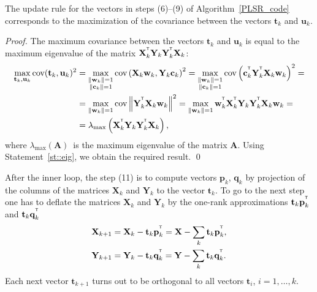 \documentclass[runningheads]{llncs}
\newcommand{\bw}{\mathbf{w}}
\newcommand{\bY}{\mathbf{Y}}
\newcommand{\bX}{\mathbf{X}}
\newcommand{\bu}{\mathbf{u}}
\newcommand{\bt}{\mathbf{t}}
\newcommand{\bp}{\mathbf{p}}
\newcommand{\bq}{\mathbf{q}}
\newcommand{\bc}{\mathbf{c}}
\newcommand{\T}{^{\text{\tiny\sffamily\upshape\mdseries T}}}
\begin{document}
\begin{proposition}

The update rule for the vectors in steps (6)--(9) of Algorithm~\ref{PLSR_code} corresponds to the maximization of the covariance between the vectors $\bt_k$ and $\bu_k$.
\end{proposition}
\begin{proof}
The maximum covariance between the vectors $\bt_k$ and $\bu_k$ is equal to the maximum eigenvalue of the matrix $\bX_k^{\T} \bY_k \bY_k^{\T} \bX_k$:
\begin{align*}
\max_{\bt_k, \bu_k}  \text{cov} (\bt_k, \bu_k)^2 &= \max_{\substack{\|\bw_k\|=1 \\ \|\bc_k\| = 1}} \text{cov} \left( \bX_k \bw_k, \bY_k \bc_k \right)^2 = \max_{\substack{\|\bw_k\|=1 \\ \|\bc_k\| = 1}} \text{cov} \left(\bc_k^{\T}  \bY_k^{\T} \bX_k \bw_k \right)^2 = \\
&= \max_{\|\bw_k\| = 1} \text{cov} \left\|\bY_k^{\T} \bX_k \bw_k \right\|^2 = \max_{\|\bw_k\| = 1} \bw_k^{\T} \bX_k^{\T} \bY_k \bY_k^{\T} \bX_k \bw_k = \\
& = \lambda_{\max} \left( \bX_k^{\T} \bY_k \bY_k^{\T} \bX_k \right),
\end{align*}
where $ \lambda_{\max} (\mathbf{A})$~is the maximum eigenvalue of the matrix $\mathbf{A}$.
Using Statement~\ref{st::eig}, we obtain the required result.
\qed
\end{proof}

After the inner loop, the step (11) is to compute vectors $\bp_k$, $\bq_k$ by projection of the columns of the matrices $\bX_k$ and $\bY_k$ to the vector $\bt_k$. 
To go to the next step one has to deflate the matrices $\bX_k$ and $\bY_k$ by the one-rank approximations $\bt_k \bp_k^{\T}$ and $\bt_k \bq_k^{\T}$
\begin{align*}
    \bX_{k + 1} &= \bX_{k} - \bt_k \bp_k^{\T} = \bX - \sum_k \bt_k \bp_k^{\T}, \\
    \bY_{k + 1} &= \bY_{k} - \bt_k \bq_k^{\T} = \bY - \sum_k \bt_k \bq_k^{\T}.
\end{align*}
Each next vector $\bt_{k+1}$ turns out to be orthogonal to all vectors $\bt_i$, $i=1, \dots, k$.
\end{document}
